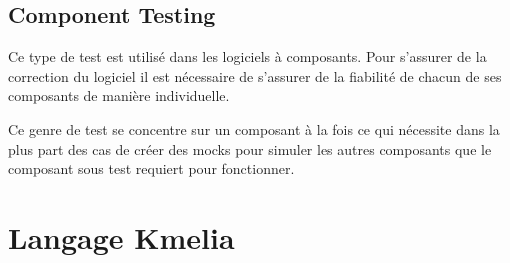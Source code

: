 \subsection*{Component Testing}
    
    Ce type de test est utilisé dans les logiciels à composants. Pour s'assurer de la correction du logiciel il est nécessaire de s'assurer de la fiabilité de chacun de ses composants de manière individuelle. 
    
    Ce genre de test se concentre sur un composant à la fois ce qui nécessite dans la plus part des cas de créer des mocks pour simuler les autres composants que le composant sous test requiert pour fonctionner.

\section{Langage Kmelia}
\label{sec:KmeliaCOSTOLangage}

\begin{comment}
    language to describe a component model based on the description of complex services. Kmelia components are abstract, independent from their environment and therefore non-executable.
    Kmelia can be used to model software architectures and their properties, these models being later refined to execution platforms. It can also be used as a common model for studying component or service model properties (abstraction, interoperability, composability). Kmelia main characteristics are: components, services, software architectures, protocols, contracts, specification of complex interaction between services.
    
    Kmelia est un langage à composants multi-services. On distingue les services offerts qui réalisent des fonctionnalités et les services requis qui déclarent les besoins du composant. Ce langage permet de modéliser des composants logiciels, des architectures logicielles par assemblage avec leurs propriétés, afin de permettre une bonne lisibilité, flexibilité et une bonne traçabilité dans la conception des architectures. Kmelia répond aux besoins suivants :
    Une réelle réutilisation des composants.
    Un modèle indépendant des plateformes d’exécution.
    Un langage de spécification de composants, de services et de leur assemblage.
    Un cadre de développement de composants afin d’élaborer des composants corrects par construction et raisonner sur des assemblages des composants.
    Les analyses de propriétés des spécifications Kmelia sont mises en œuvre dans la plateforme d’expérimentation ouverte Costo, sous forme d’un ensemble de plugins Eclipse.


\end{comment}

